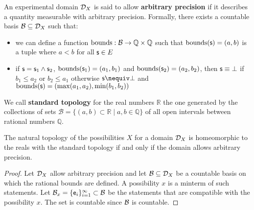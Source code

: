 \documentclass[11pt,letterpaper,fleqn]{memoir} %
\begin{document}
\begin{mathSection}
	
	\begin{defn}
		An experimental domain $\edomain_X$ is said to allow \textbf{arbitrary precision} if it describes a quantity measurable with arbitrary precision. Formally, there exists a countable basis $\basis \subseteq \edomain_X$ such that:
		\begin{itemize}
			\item we can define a function $\operatorname{bounds} : \basis \to \mathbb{Q} \times \mathbb{Q}$ such that $\operatorname{bounds}(\stmt) = (a, b)$ is a tuple where $a < b$ for all $\stmt \in E$
			\item if $\stmt = \stmt_1 \AND \stmt_2$, $\operatorname{bounds}(\stmt_1) = (a_1, b_1)$ and $\operatorname{bounds}(\stmt_2) = (a_2, b_2)$, then $\stmt \equiv \contradiction$ if $b_1 \leq a_2$ or $b_2 \leq a_1$ otherwise $\stmt \nequiv \contradiction$ and $\operatorname{bounds}(\stmt) = (\max(a_1, a_2), \min(b_1, b_2))$
		\end{itemize}
	\end{defn}
	
	\begin{defn}
		We call \textbf{standard topology} for the real numbers $\mathbb{R}$ the one generated by the collections of sets $\mathcal{B} = \{ (a,b) \subset \mathbb{R} \; | \; a,b \in \mathbb{Q} \}$ of all open intervals between rational numbers $\mathbb{Q}$.
	\end{defn}
	
	\begin{thrm}\label{thrm_arbitrary_precision_is_continuity}
		The natural topology of the possibilities $X$ for a domain $\edomain_X$ is homeomorphic to the reals with the standard topology if and only if the domain allows arbitrary precision.
	\end{thrm}
	\begin{proof}
		Let $\edomain_X$ allow arbitrary precision and let $\basis \subseteq \edomain_X$ be a countable basis on which the rational bounds are defined. A possibility $x$ is a minterm of such statements. Let $\basis_x =\{\obs[e]_i\}_{i=1}^{\infty} \subset \basis$ be the statements that are compatible with the possibility $x$. The set is countable since $\basis$ is countable.
		

\end{proof}
\end{mathSection}
\end{document}
